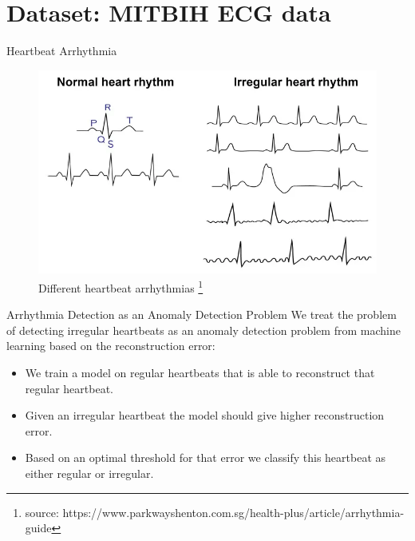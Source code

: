 \section{Dataset: MITBIH ECG data}
\begin{frame}{Heartbeat Arrhythmia}
    \begin{figure}
        \centering
        \includegraphics[scale=0.3]{images/heartbeat_arr.png}
        \caption[]{Different heartbeat arrhythmias \footnote{source: https://www.parkwayshenton.com.sg/health-plus/article/arrhythmia-guide}}
        \label{fig:enter-label}
    \end{figure}
\end{frame}

\begin{frame}{Arrhythmia Detection as an Anomaly Detection Problem}
We treat the problem of detecting irregular heartbeats as an anomaly detection problem from machine learning based on the reconstruction error:
\begin{itemize}
    \item<2->  We train a model \alert{on regular heartbeats} that is able to reconstruct that regular heartbeat.
    \item<3->  Given an irregular heartbeat the model should give \alert{higher reconstruction error}.
    \item<4->  Based on an optimal \alert{threshold} for that error we classify this heartbeat as either regular or irregular.
\end{itemize}
\end{frame} 

